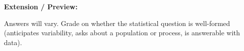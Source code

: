 \documentclass[10pt]{article}
\begin{document}
\begin{practicebox}
\vspace{6pt}
\textbf{Extension / Preview:}
\begin{teachernote}
Answers will vary. Grade on whether the statistical question is well-formed (anticipates variability, asks about a population or process, is answerable with data).
\end{teachernote}

\end{practicebox}
\end{document}
